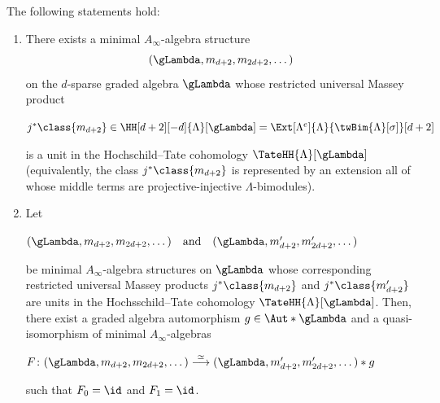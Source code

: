 \documentclass[a4paper]{amsart}
\begin{document}
\begin{theorem}
  \label{thm:A-Ainfty-version}
  The following statements hold:
  \begin{enumerate}
  \item\label{it:existence}There exists a minimal $A_\infty$-algebra structure
    \[
      (\gLambda,m_{d+2},m_{2d+2},\dots)
    \]
    on the $d$-sparse graded algebra $\gLambda$ whose restricted universal
    Massey product
    \begin{center}
      $j^*\class{m_{d+2}}\in\HH[d+2][-d]{\Lambda}[\gLambda]=\Ext[\Lambda^e]{\Lambda}{\twBim{\Lambda}[\sigma]}[d+2]$
    \end{center}
    is a unit in the Hochschild--Tate cohomology $\TateHH{\Lambda}[\gLambda]$
    (equivalently, the class $j^*\class{m_{d+2}}$ is represented by an extension
    all of whose middle terms are projective-injective $\Lambda$-bimodules).
  \item\label{it:uniqueness} Let
    \begin{center}
      $(\gLambda,m_{d+2},m_{2d+2},\dots)\quad\text{and}\quad(\gLambda,m_{d+2}',m_{2d+2}',\dots)$
    \end{center}
    be minimal $A_\infty$-algebra structures on $\gLambda$ whose corresponding
    restricted universal Massey products $j^*\class{m_{d+2}}$ and
    $j^*\class{m_{d+2}'}$ are units in the Hochs\-schild--Tate cohomology
    $\TateHH{\Lambda}[\gLambda]$. Then, there exist a graded algebra
    automorphism $g\in\Aut*{\gLambda}$ and a quasi-iso\-mor\-phism of minimal
    $A_\infty$-algebras
    \begin{center}
      $F\colon(\gLambda,m_{d+2},m_{2d+2},\dots)\stackrel{\simeq}{\longrightarrow}(\gLambda,m_{d+2}',m_{2d+2}',\dots)*g$
    \end{center}
    such that $F_0=\id$ and $F_1=\id$.
  \end{enumerate}
\end{theorem}
\end{document}
